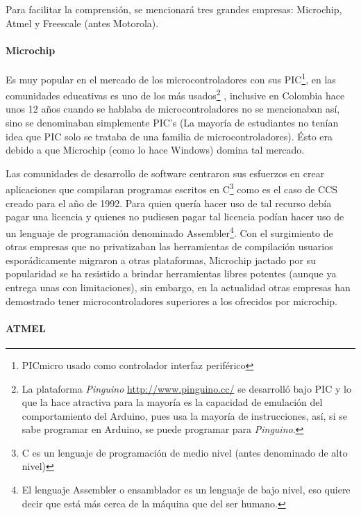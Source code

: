 \documentclass{article}
\begin{document}
Para facilitar la comprensión, se mencionará tres grandes empresas: 
Microchip, Atmel y Freescale (antes Motorola).

\paragraph{Microchip} 

Es muy popular en el mercado de los microcontroladores con sus
PIC\footnote{PICmicro usado como controlador interfaz periférico}, en las
comunidades educativas es uno de los más usados\footnote{ 
La plataforma \textit{Pinguino} \url{http://www.pinguino.cc/}
se desarrolló bajo PIC y lo que la hace atractiva para la mayoría es la 
capacidad de emulación del comportamiento del Arduino, pues usa la mayoría 
de instrucciones, así, 
si se sabe programar en Arduino, se puede programar para \textit{Pinguino}.}
, inclusive en Colombia hace unos 12 años cuando se hablaba de 
microcontroladores no se mencionaban así, sino se denominaban simplemente 
PIC's (La mayoría de estudiantes no tenían idea que PIC solo se trataba de 
una familia de microcontroladores). Ésto era debido a que Microchip (como 
lo hace Windows) domina tal mercado.

Las comunidades de desarrollo de 
software centraron sus esfuerzos en crear aplicaciones que compilaran 
programas escritos en C\footnote{ C es un lenguaje de programación de 
medio nivel (antes denominado de alto nivel)} como es el caso de CCS creado
para el año de 1992. Para quien quería hacer uso de tal recurso debía pagar
una licencia y quienes no pudiesen pagar tal licencia podían hacer uso
de un lenguaje de programación denominado Assembler\footnote{El lenguaje 
		Assembler o ensamblador es un lenguaje de bajo nivel, eso quiere
decir que está más cerca de la máquina que del ser humano.}. Con el
surgimiento de otras empresas que no privatizaban las herramientas de 
compilación usuarios esporádicamente migraron a otras plataformas,
Microchip jactado por su popularidad se ha resistido a brindar herramientas
libres potentes (aunque ya entrega unas con limitaciones), sin embargo, en
la actualidad otras empresas han demostrado tener microcontroladores 
superiores a los ofrecidos por microchip.

\paragraph{ATMEL}
\end{document}
